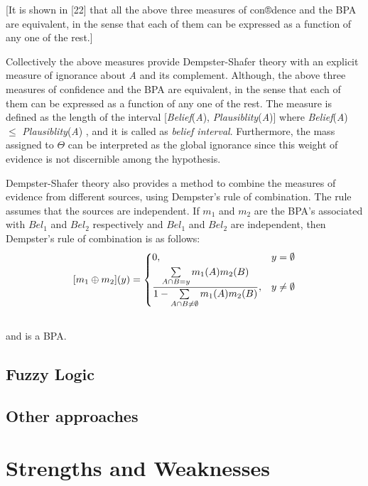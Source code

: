 \documentclass[11pt]{article}
\begin{document}
[It is shown in [22] that all the above three measures of con®dence and the BPA
are equivalent, in the sense that each of them can be expressed as a function of
any one of the rest.]

Collectively the above measures provide Dempster-Shafer theory with an explicit
measure of ignorance about \textit{A} and its complement. Although, the above
three measures of confidence and the BPA are equivalent, in the sense that each
of them can be expressed as a function of any one of the rest. The measure
is defined as the length of the interval [\textit{Belief}(\textit{A}),
\textit{Plausiblity}(\textit{A})] where \textit{Belief}(\textit{A}) $\leqslant$
\textit{Plausiblity}(\textit{A}) \cite{yager:dst-combination-rules}, and it is
called as \textit{belief interval}. Furthermore, the mass assigned to $\Theta$
can be interpreted as the global ignorance since this weight of evidence is not
discernible among the hypothesis.

Dempster-Shafer theory also provides a method to combine the measures of
evidence from different sources, using Dempster's rule of combination. The rule
assumes that the sources are independent. If $m_1$ and $m_2$ are the BPA's
associated with $Bel_1$ and $Bel_2$ respectively and $Bel_1$ and $Bel_2$ are
independent, then Dempster's rule of combination is as follows:\\

\[
	[m_1 \oplus m_2](y) = 
    \begin{dcases}
      0, & y = \emptyset \\
      \frac{\sum\limits_{A \cap B = y}m_1(A)m_2(B)}{1-\sum\limits_{A
      \cap B \neq \emptyset}m_1(A)m_2(B)}, & y
      \neq
      \emptyset
	\end{dcases}
\]\\

\noindent and is a BPA.
\subsection{Fuzzy Logic}

\subsection{Other approaches}

\section{Strengths and Weaknesses}
\end{document}
